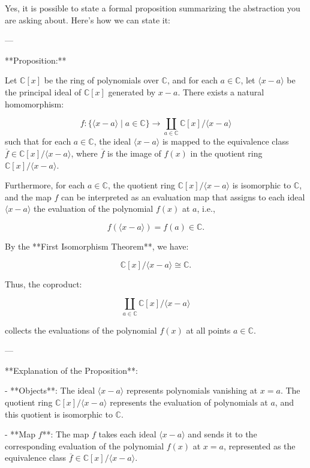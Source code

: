 \documentclass[11pt,openany]{article}
\begin{document}
\newpage

Yes, it is possible to state a formal proposition summarizing the abstraction you are asking about. Here’s how we can state it:

---

**Proposition:**

Let \( \mathbb{C}[x] \) be the ring of polynomials over \( \mathbb{C} \), and for each \( a \in \mathbb{C} \), let \( \langle x - a \rangle \) be the principal ideal of \( \mathbb{C}[x] \) generated by \( x - a \). There exists a natural homomorphism:

\[
f: \{\langle x - a \rangle \mid a \in \mathbb{C} \} \to \coprod_{a \in \mathbb{C}} \mathbb{C}[x] / \langle x - a \rangle
\]
such that for each \( a \in \mathbb{C} \), the ideal \( \langle x - a \rangle \) is mapped to the equivalence class \( \overline{f} \in \mathbb{C}[x] / \langle x - a \rangle \), where \( \overline{f} \) is the image of \( f(x) \) in the quotient ring \( \mathbb{C}[x] / \langle x - a \rangle \).

Furthermore, for each \( a \in \mathbb{C} \), the quotient ring \( \mathbb{C}[x] / \langle x - a \rangle \) is isomorphic to \( \mathbb{C} \), and the map \( f \) can be interpreted as an evaluation map that assigns to each ideal \( \langle x - a \rangle \) the evaluation of the polynomial \( f(x) \) at \( a \), i.e.,

\[
f(\langle x - a \rangle) = f(a) \in \mathbb{C}.
\]

By the **First Isomorphism Theorem**, we have:

\[
\mathbb{C}[x] / \langle x - a \rangle \cong \mathbb{C}.
\]

Thus, the coproduct:

\[
\coprod_{a \in \mathbb{C}} \mathbb{C}[x] / \langle x - a \rangle
\]

collects the evaluations of the polynomial \( f(x) \) at all points \( a \in \mathbb{C} \).

---

**Explanation of the Proposition**:

- **Objects**: The ideal \( \langle x - a \rangle \) represents polynomials vanishing at \( x = a \). The quotient ring \( \mathbb{C}[x] / \langle x - a \rangle \) represents the evaluation of polynomials at \( a \), and this quotient is isomorphic to \( \mathbb{C} \).

- **Map \( f \)**: The map \( f \) takes each ideal \( \langle x - a \rangle \) and sends it to the corresponding evaluation of the polynomial \( f(x) \) at \( x = a \), represented as the equivalence class \( \overline{f} \in \mathbb{C}[x] / \langle x - a \rangle \).
\end{document}
